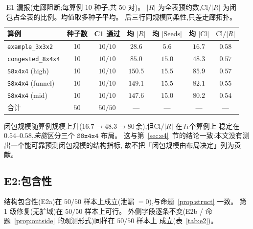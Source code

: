 \documentclass[manuscript,screen,review]{acmart}
\newcommand{\NSeeds}{10}
\newcommand{\NPairs}{50}
\newcommand{\PassMiss}{\NPairs/\NPairs}      %
\newcommand{\PassClosed}{\NPairs/\NPairs}    %
\newcommand{\PassInvar}{\NPairs/\NPairs}     %
\begin{document}
\begin{table}[t]
\centering
\caption{E1 漏报(走廊阻断;每算例 \(\NSeeds\) 种子,共 \(\NPairs\) 对)。
\(|R|\) 为全表预约数,\(\mathrm{Cl}/|R|\) 为闭包占全表的比例。均值取多种子平均。
后三行同规模同柔性,只差走廊拓扑。}
\label{tab:e1}
\small
\begin{tabular}{@{}lcccccc@{}}
\toprule
算例 & 种子数 & C1 通过 & 均 \(|R|\) & 均 \(|\mathrm{Seeds}|\)
 & 均 \(|\mathrm{Cl}|\) & \(\mathrm{Cl}/|R|\) \\
\midrule
\texttt{example\_3x3x2}   & 10 & \(10/10\) & \(28.6\)  & \(5.6\)  & \(16.7\) & \(0.58\) \\
\texttt{congested\_8x4x4} & 10 & \(10/10\) & \(85.0\)  & \(15.0\) & \(48.3\) & \(0.57\) \\
\texttt{S8x4x4} (high)    & 10 & \(10/10\) & \(150.5\) & \(15.5\) & \(85.9\) & \(0.57\) \\
\texttt{S8x4x4} (funnel)  & 10 & \(10/10\) & \(149.1\) & \(15.5\) & \(82.1\) & \(0.55\) \\
\texttt{S8x4x4} (mid)     & 10 & \(10/10\) & \(147.6\) & \(15.0\) & \(80.2\) & \(0.54\) \\
\midrule
合计 & \(\NPairs\) & \(\PassMiss\) & --- & --- & --- & --- \\
\bottomrule
\end{tabular}
\end{table}

闭包规模随算例规模上升(\(16.7\to 48.3\to 80\)\,余),但\(\mathrm{Cl}/|R|\) 在五个算例上
稳定在 \(0.54\)--\(0.58\),\emph{未能}区分三个 \(\texttt{S8x4x4}\) 布局。
这与第~\ref{sec:e4}~节的结论一致:本文没有测出一个能可靠预测闭包规模的结构指标,
故不把「闭包规模由布局决定」列为贡献。

\subsection{E2:包含性}
\label{sec:e2}

结构包含性(E2a)在 \(\PassClosed\) 样本上成立(泄漏 \(=0\)),与命题~\ref{prop:struct} 一致。
第 1 级修复(无扩域)在 \(\NPairs/\NPairs\) 样本上可行。
外侧字段逐条不变(E2b / 命题~\ref{prop:outside} 的观测形式)同样在 \(\PassInvar\) 样本上
成立(表~\ref{tab:e2})。
\end{document}

